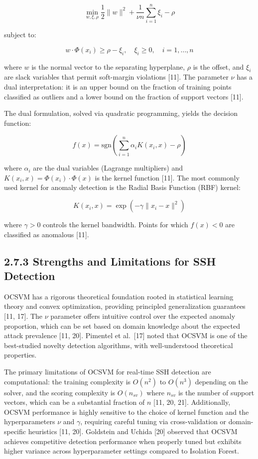 \documentclass[
  a4paper]{report}
\begin{document}
\[\min_{w, \xi, \rho} \frac{1}{2} \|w\|^2 + \frac{1}{\nu n} \sum_{i=1}^{n} \xi_i - \rho\]

subject to:

\[w \cdot \Phi(x_i) \geq \rho - \xi_i, \quad \xi_i \geq 0, \quad i = 1, \ldots, n\]

where \(w\) is the normal vector to the separating hyperplane, \(\rho\)
is the offset, and \(\xi_i\) are slack variables that permit soft-margin
violations {[}11{]}. The parameter \(\nu\) has a dual interpretation: it
is an upper bound on the fraction of training points classified as
outliers and a lower bound on the fraction of support vectors {[}11{]}.

The dual formulation, solved via quadratic programming, yields the
decision function:

\[f(x) = \text{sgn}\left( \sum_{i=1}^{n} \alpha_i K(x_i, x) - \rho \right)\]

where \(\alpha_i\) are the dual variables (Lagrange multipliers) and
\(K(x_i, x) = \Phi(x_i) \cdot \Phi(x)\) is the kernel function {[}11{]}.
The most commonly used kernel for anomaly detection is the Radial Basis
Function (RBF) kernel:

\[K(x_i, x) = \exp\left( -\gamma \|x_i - x\|^2 \right)\]

where \(\gamma > 0\) controls the kernel bandwidth. Points for which
\(f(x) < 0\) are classified as anomalous {[}11{]}.

\subsection{2.7.3 Strengths and Limitations for SSH
Detection}\label{strengths-and-limitations-for-ssh-detection-1}

OCSVM has a rigorous theoretical foundation rooted in statistical
learning theory and convex optimization, providing principled
generalization guarantees {[}11, 17{]}. The \(\nu\) parameter offers
intuitive control over the expected anomaly proportion, which can be set
based on domain knowledge about the expected attack prevalence {[}11,
20{]}. Pimentel et al.~{[}17{]} noted that OCSVM is one of the
best-studied novelty detection algorithms, with well-understood
theoretical properties.

The primary limitations of OCSVM for real-time SSH detection are
computational: the training complexity is \(O(n^2)\) to \(O(n^3)\)
depending on the solver, and the scoring complexity is \(O(n_{sv})\)
where \(n_{sv}\) is the number of support vectors, which can be a
substantial fraction of \(n\) {[}11, 20, 21{]}. Additionally, OCSVM
performance is highly sensitive to the choice of kernel function and the
hyperparameters \(\nu\) and \(\gamma\), requiring careful tuning via
cross-validation or domain-specific heuristics {[}11, 20{]}. Goldstein
and Uchida {[}20{]} observed that OCSVM achieves competitive detection
performance when properly tuned but exhibits higher variance across
hyperparameter settings compared to Isolation Forest.
\end{document}
